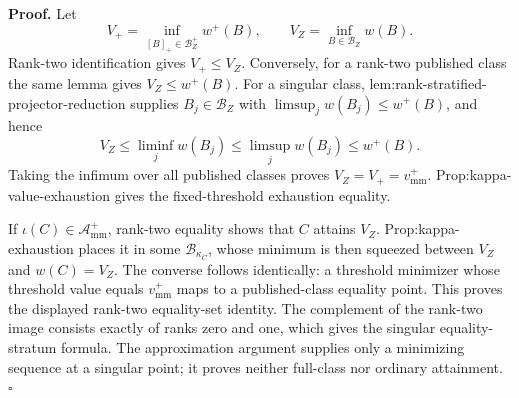 \textbf{Proof.}
Let
\[
V_+=\inf_{[B]_+\in\mathcal B_Z^+}w^+(B),
\qquad V_Z=\inf_{B\in\mathcal B_Z}w(B).
\]
Rank-two identification gives \(V_+\le V_Z\).  Conversely, for a rank-two published class the same lemma gives \(V_Z\le w^+(B)\).  For a singular class, lem:rank-stratified-projector-reduction supplies \(B_j\in\mathcal B_Z\) with \(\limsup_jw(B_j)\le w^+(B)\), and hence
\[
V_Z\le\liminf_jw(B_j)\le\limsup_jw(B_j)\le w^+(B).
\]
Taking the infimum over all published classes proves \(V_Z=V_+=v_{\mathrm{mm}}^+\).  Prop:kappa-value-exhaustion gives the fixed-threshold exhaustion equality.

If \(\iota(C)\in\mathcal A_{\mathrm{mm}}^+\), rank-two equality shows that \(C\) attains \(V_Z\).  Prop:kappa-exhaustion places it in some \(\mathcal B_{\kappa_C}\), whose minimum is then squeezed between \(V_Z\) and \(w(C)=V_Z\).  The converse follows identically: a threshold minimizer whose threshold value equals \(v_{\mathrm{mm}}^+\) maps to a published-class equality point.  This proves the displayed rank-two equality-set identity.  The complement of the rank-two image consists exactly of ranks zero and one, which gives the singular equality-stratum formula.  The approximation argument supplies only a minimizing sequence at a singular point; it proves neither full-class nor ordinary attainment. \(\square\)